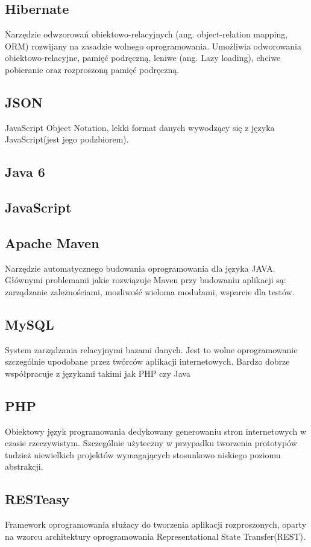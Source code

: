 \documentclass[11pt,a4paper,polish,thesis]{dcsbook}
\begin{document}
\subsection{Hibernate}
Narzędzie odwzorowań obiektowo-relacyjnych (ang. object-relation mapping, ORM) rozwijany na zasadzie wolnego oprogramowania. Umożliwia odworowania obiektowo-relacyjne, pamięć podręczną, leniwe (ang. Lazy loading), chciwe pobieranie oraz rozproszoną pamięć podręczną.
\subsection{JSON}
JavaScript Object Notation, lekki format danych wywodzący się z języka JavaScript(jest jego podzbiorem). 
\subsection{Java 6}
\subsection{JavaScript}
\subsection{Apache Maven}
Narzędzie automatycznego budowania oprogramowania dla języka JAVA. Głównymi problemami jakie rozwiązuje Maven przy budowaniu aplikacji są: zarządzanie zależnościami, mozliwość wieloma modułami, wsparcie dla testów.
\subsection{MySQL}
System zarządzania relacyjnymi bazami danych. Jest to wolne oprogramowanie szczególnie upodobane przez twórców aplikacji internetowych. Bardzo dobrze współpracuje z językami takimi jak PHP czy Java
\subsection{PHP}
Obiektowy język programowania dedykowany generowaniu stron internetowych w czasie rzeczywistym. Szczególnie użyteczny w przypadku tworzenia prototypów tudzież niewielkich projektów wymagających stosunkowo niskiego poziomu abstrakcji.
\subsection{RESTeasy}
Framework oprogramowania służacy do tworzenia aplikacji rozproszonych, oparty na wzorcu architektury oprogramowania Representational State Transfer(REST).
\end{document}
